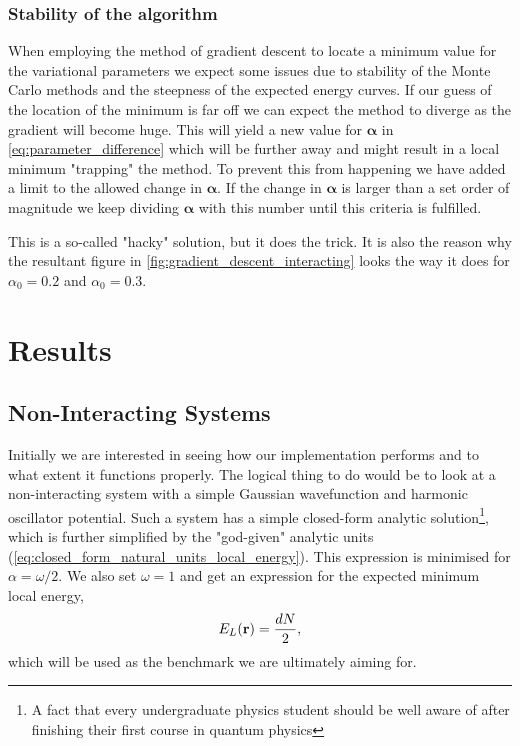 \documentclass[
    a4paper, aps, twocolumn, floatfix, superscriptaddress,
    nofootinbib]{revtex4-1}
\newcommand{\vfg}{\boldsymbol}
\newcommand{\1}{\mathds{1}}
\begin{document}
            \subsubsection{Stability of the algorithm}
                When employing the method of gradient descent to locate a
                minimum value for the variational parameters we expect some
                issues due to stability of the Monte Carlo methods and the
                steepness of the expected energy curves. If our guess of the
                location of the minimum is far off we can expect the method to
                diverge as the gradient will become huge. This will yield a
                new value for $\vfg{\alpha}$ in
                \autoref{eq:parameter_difference} which will be further away and
                might result in a local minimum "trapping" the method. To
                prevent this from happening we have added a limit to the allowed
                change in $\vfg{\alpha}$. If the change in $\vfg{\alpha}$ is
                larger than a set order of magnitude we keep dividing
                $\vfg{\alpha}$ with this number until this criteria is
                fulfilled.

                This is a so-called "hacky" solution, but it does the trick. It
                is also the reason why the resultant figure in
                \autoref{fig:gradient_descent_interacting} looks the way it
                does for $\alpha_0 = 0.2$ and $\alpha_0 = 0.3$.

\section{Results}

    \subsection{Non-Interacting Systems}
        Initially we are interested in seeing how our implementation performs
        and to what extent it functions properly. The logical thing to do would
        be to look at a non-interacting system with a simple Gaussian
        wavefunction and harmonic oscillator potential. Such a system has a
        simple closed-form analytic solution\footnote{A fact that every
        undergraduate physics student should be well aware of after finishing
        their first course in quantum physics}, which is further simplified by
        the "god-given" analytic units
        (\autoref{eq:closed_form_natural_units_local_energy}). This expression
        is minimised for $\alpha = \omega/2$. We also set $\omega = 1$
        and get an expression for the expected minimum local energy,
        \begin{equation}
            E_L(\vb{r}) = \frac{dN}{2},
        \end{equation}
        which will be used as the benchmark we are ultimately aiming for.
\end{document}
